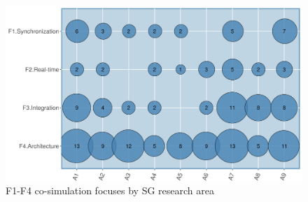 \documentclass[1p]{elsarticle} %
\begin{document}
\begin{figure}[!htb]
\centering
\includegraphics[width=0.97\linewidth]{img/F1-F4-A1-A9.png}
\caption{F1-F4 co-simulation focuses by SG research area}
\label{fig:focus-co-sim-F1-F4-A1-A9}
\end{figure}


\end{document}

